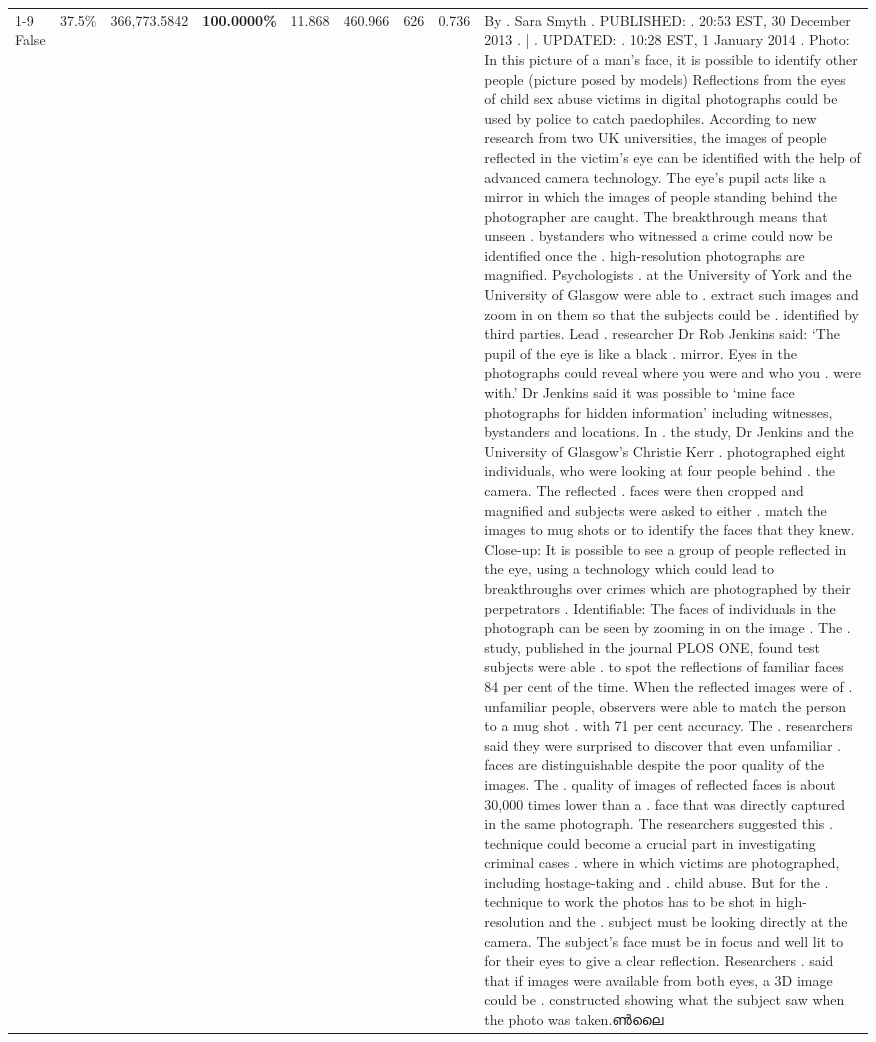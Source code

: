 \begin{table}[H]
\begin{tabular}{lllrlllll}
\cline{1-9}
False & 37.5\% & 366,773.5842 & \bfseries \color{red} 100.0000\% & 11.868 & 460.966 & 626 & 0.736 & By . Sara Smyth . PUBLISHED: . 20:53 EST, 30 December 2013 . | . UPDATED: . 10:28 EST, 1 January 2014 . Photo: In this picture of a man's face, it is possible to identify other people (picture posed by models) Reflections from the eyes of child sex abuse victims in digital photographs could be used by police to catch paedophiles. According to new research from two UK universities, the images of people reflected in the victim's eye can be identified with the help of advanced camera technology. The eye's pupil acts like a mirror in which the images of people standing behind the photographer are caught. The breakthrough means that unseen . bystanders who witnessed a crime could now be identified once the . high-resolution photographs are magnified. Psychologists . at the University of York and the University of Glasgow were able to . extract such images and zoom in on them so that the subjects could be . identified by third parties. Lead . researcher Dr Rob Jenkins said: ‘The pupil of the eye is like a black . mirror. Eyes in the photographs could reveal where you were and who you . were with.' Dr Jenkins said it was possible to ‘mine face photographs for hidden information' including witnesses, bystanders and locations. In . the study, Dr Jenkins and the University of Glasgow's Christie Kerr . photographed eight individuals, who were looking at four people behind . the camera. The reflected . faces were then cropped and magnified and subjects were asked to either . match the images to mug shots or to identify the faces that they knew. Close-up: It is possible to see a group of people reflected in the eye, using a technology which could lead to breakthroughs over crimes which are photographed by their perpetrators . Identifiable: The faces of individuals in the photograph can be seen by zooming in on the image . The . study, published in the journal PLOS ONE, found test subjects were able . to spot the reflections of familiar faces 84 per cent of the time. When the reflected images were of . unfamiliar people, observers were able to match the person to a mug shot . with 71 per cent accuracy. The . researchers said they were surprised to discover that even unfamiliar . faces are distinguishable despite the poor quality of the images. The . quality of images of reflected faces is about 30,000 times lower than a . face that was directly captured in the same photograph. The researchers suggested this . technique could become a crucial part in investigating criminal cases . where in which victims are photographed, including hostage-taking and . child abuse. But for the . technique to work the photos has to be shot in high-resolution and the . subject must be looking directly at the camera. The subject's face must be in focus and well lit to for their eyes to give a clear reflection. Researchers . said that if images were available from both eyes, a 3D image could be . constructed showing what the subject saw when the photo was taken.ൺലൈ \\

\end{tabular}
\end{table}
